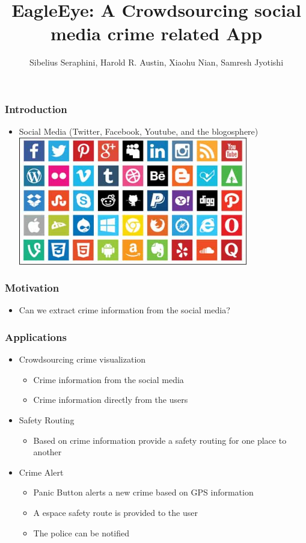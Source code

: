 \documentclass{beamer}
\title[EagleEye]{EagleEye: A Crowdsourcing social media crime related App}
\institute[CSI 431]{
    CSI 431 - Data Mining
}
\author[Seraphini,Austin,Nian,Jyotishi]{Sibelius Seraphini, Harold R. Austin, Xiaohu Nian, Samresh Jyotishi}
\date{}
\begin{document}
    \frame{\titlepage}

    \begin{frame}
        \frametitle{Introduction}
        \begin{itemize}[<+->]
            \item Social Media (Twitter, Facebook, Youtube, and the blogosphere)
            \includegraphics[width=10cm]{social_media}
        \end{itemize}
    \end{frame}


    \begin{frame}
        \frametitle{Motivation}
        \begin{itemize}
            \item Can we extract crime information from the social media?
        \end{itemize}
    \end{frame}

    \begin{frame}
        \frametitle{Applications}
        \begin{itemize} [<+->]
            \item Crowdsourcing crime visualization
                \begin{itemize}
                    \item Crime information from the social media
                    \item Crime information directly from the users
                \end{itemize}
            \item Safety Routing
                \begin{itemize}
                    \item Based on crime information provide a safety routing for one place to another
                \end{itemize}
            \item Crime Alert
                \begin{itemize}
                    \item Panic Button alerts a new crime based on GPS information
                    \item A espace safety route is provided to the user
                    \item The police can be notified
                \end{itemize}
        \end{itemize}
    \end{frame}
\end{document}
